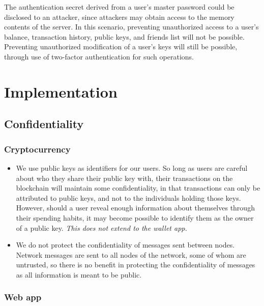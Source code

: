 \documentclass[12pt]{article}
\begin{document}
The authentication secret derived from a user's master password could be disclosed to an attacker, since attackers may obtain access to the memory contents of the server.
In this scenario, preventing unauthorized access to a user's balance, transaction history, public keys, and friends list will not be possible.
Preventing unauthorized modification of a user's keys will still be possible, through use of two-factor authentication for such operations.

\section{Implementation}

\subsection{Confidentiality}

\subsubsection*{Cryptocurrency}

\begin{itemize}
	\item We use public keys as identifiers for our users. So long as users are careful about who they share their public key with, their transactions on the blockchain will maintain some confidentiality, in that transactions can only be attributed to public keys, and not to the individuals holding those keys.
	However, should a user reveal enough information about themselves through their spending habits, it may become possible to identify them as the owner of a public key.
	\textit{This does not extend to the wallet app.}
	\item We do not protect the confidentiality of messages sent between nodes.
	Network messages are sent to all nodes of the network, some of whom are untrusted, so there is no benefit in protecting the confidentiality of messages as all information is meant to be public.
\end{itemize}

\subsubsection*{Web app}
\end{document}
